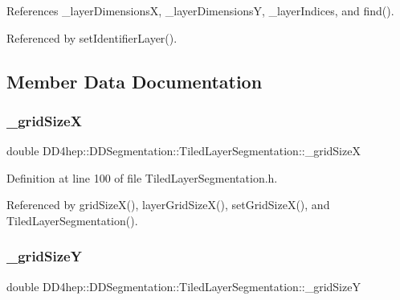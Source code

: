 References \+\_\+layer\+DimensionsX, \+\_\+layer\+DimensionsY, \+\_\+layer\+Indices, and find().



Referenced by set\+Identifier\+Layer().



\subsection{Member Data Documentation}
\hypertarget{class_d_d4hep_1_1_d_d_segmentation_1_1_tiled_layer_segmentation_a8e60c82ed47b0b33c4c7918baea38296}{}\label{class_d_d4hep_1_1_d_d_segmentation_1_1_tiled_layer_segmentation_a8e60c82ed47b0b33c4c7918baea38296} 
\subsubsection{\texorpdfstring{\+\_\+grid\+SizeX}{\_gridSizeX}}
{\footnotesize\ttfamily double D\+D4hep\+::\+D\+D\+Segmentation\+::\+Tiled\+Layer\+Segmentation\+::\+\_\+grid\+SizeX\hspace{0.3cm}{\ttfamily [protected]}}



Definition at line 100 of file Tiled\+Layer\+Segmentation.\+h.



Referenced by grid\+Size\+X(), layer\+Grid\+Size\+X(), set\+Grid\+Size\+X(), and Tiled\+Layer\+Segmentation().

\hypertarget{class_d_d4hep_1_1_d_d_segmentation_1_1_tiled_layer_segmentation_a71e5e4524b30002b118f464626558c39}{}\label{class_d_d4hep_1_1_d_d_segmentation_1_1_tiled_layer_segmentation_a71e5e4524b30002b118f464626558c39} 
\subsubsection{\texorpdfstring{\+\_\+grid\+SizeY}{\_gridSizeY}}
{\footnotesize\ttfamily double D\+D4hep\+::\+D\+D\+Segmentation\+::\+Tiled\+Layer\+Segmentation\+::\+\_\+grid\+SizeY\hspace{0.3cm}{\ttfamily [protected]}}



